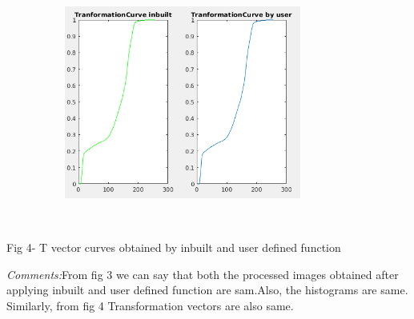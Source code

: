 \documentclass[12pt]{article}
\begin{document}
\vspace{\baselineskip}



\begin{figure}[H]
	\begin{Center}
		\includegraphics[width=3.75in,height=2.5in]{./media/image22.png}
	\end{Center}
\end{figure}



\begin{Center}
\ \ \ \ \ \ \ \ \ \ \ \ \ \ \ \ \ \ \ \ \ \ \ \ \ \ \ \ \ \  
\end{Center}\par

\begin{adjustwidth}{1.0in}{0.0in}
\begin{Center}
Fig 4- T vector curves obtained by inbuilt and user defined function
\end{Center}\par

\end{adjustwidth}


\vspace{\baselineskip}
\begin{adjustwidth}{1.0in}{0.0in}
\begin{justify}
\textit{Comments:}From fig 3 we can say that both the processed images obtained after applying inbuilt and user defined function are sam.Also, the histograms are same. Similarly, from fig 4 Transformation vectors are also same.
\end{justify}\par

\end{adjustwidth}
\end{document}
